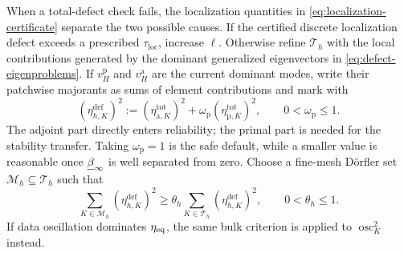 When a total-defect check fails, the localization quantities in
\eqref{eq:localization-certificate} separate the two possible causes.
If the certified discrete localization defect exceeds a prescribed
$\tau_{\mathrm{loc}}$, increase $\ell$.  Otherwise refine $\mathcal T_h$
with the local contributions generated by the dominant generalized
eigenvectors in \eqref{eq:defect-eigenproblems}.  If
$v_H^{\mathrm p}$ and $v_H^{\mathrm a}$ are the current dominant modes,
write their patchwise majorants as sums of element contributions and mark
with
\begin{equation}
\label{eq:fine-defect-indicator}
  (\eta_{h,K}^{\mathrm{def}})^2
  :=(\eta_{\mathrm a,K}^{\mathrm{tot}})^2
    +\omega_{\mathrm p}(\eta_{\mathrm p,K}^{\mathrm{tot}})^2,
  \qquad0<\omega_{\mathrm p}\leq1.
\end{equation}
The adjoint part directly enters reliability; the primal part is needed
for the stability transfer.  Taking $\omega_{\mathrm p}=1$ is the safe
default, while a smaller value is reasonable once $\underline\beta_\infty$ is well
separated from zero.  Choose a fine-mesh D\"orfler set
$\mathcal M_h\subseteq\mathcal T_h$ such that
\begin{equation}
\label{eq:fine-defect-dorfler}
  \sum_{K\in\mathcal M_h}(\eta_{h,K}^{\mathrm{def}})^2
  \geq\theta_h
       \sum_{K\in\mathcal T_h}(\eta_{h,K}^{\mathrm{def}})^2,
  \qquad0<\theta_h\leq1.
\end{equation}
If data oscillation dominates $\eta_{\mathrm{eq}}$, the same bulk criterion is applied
to $\operatorname{osc}_K^2$ instead.

